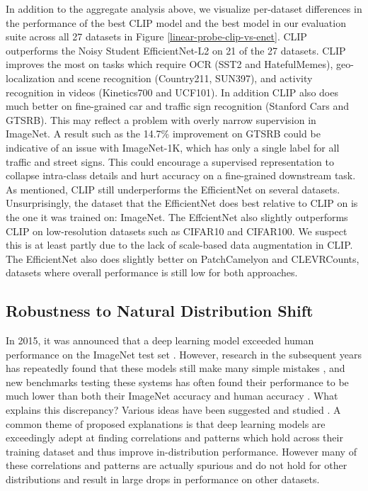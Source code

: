 In addition to the aggregate analysis above, we visualize per-dataset differences in the performance of the best CLIP model and the best model in our evaluation suite across all 27 datasets in Figure \ref{linear-probe-clip-vs-enet}. CLIP outperforms the Noisy Student EfficientNet-L2 on 21 of the 27 datasets. CLIP improves the most on tasks which require OCR (SST2 and HatefulMemes), geo-localization and scene recognition (Country211, SUN397), and activity recognition in videos (Kinetics700 and UCF101). In addition CLIP also does much better on fine-grained car and traffic sign recognition (Stanford Cars and GTSRB). This may reflect a problem with overly narrow supervision in ImageNet. A result such as the 14.7\% improvement on GTSRB could be indicative of an issue with ImageNet-1K, which has only a single label for all traffic and street signs. This could encourage a supervised representation to collapse intra-class details and hurt accuracy on a fine-grained downstream task. As mentioned, CLIP still underperforms the EfficientNet on several datasets. Unsurprisingly, the dataset that the EfficientNet does best relative to CLIP on is the one it was trained on: ImageNet. The EffcientNet also slightly outperforms CLIP on low-resolution datasets such as CIFAR10 and CIFAR100. We suspect this is at least partly due to the lack of scale-based data augmentation in CLIP. The EfficientNet also does slightly better on PatchCamelyon and CLEVRCounts, datasets where overall performance is still low for both approaches.

\subsection{Robustness to Natural Distribution Shift}
\label{subsection:robustness}

In 2015, it was announced that a deep learning model exceeded human performance on the ImageNet test set \citep{he2015delving}. However, research in the subsequent years has repeatedly found that these models still make many simple mistakes \citep{dodge2017study,geirhos2018imagenet,alcorn2019strike}, and new benchmarks testing these systems has often found their performance to be much lower than both their ImageNet accuracy and human accuracy \citep{recht2019imagenet,barbu2019objectnet}. What explains this discrepancy? Various ideas have been suggested and studied \citep{ilyas2019adversarial,geirhos2020shortcut}. A common theme of proposed explanations is that deep learning models are exceedingly adept at finding correlations and patterns which hold across their training dataset and thus improve in-distribution performance. However many of these correlations and patterns are actually spurious and do not hold for other distributions and result in large drops in performance on other datasets.

